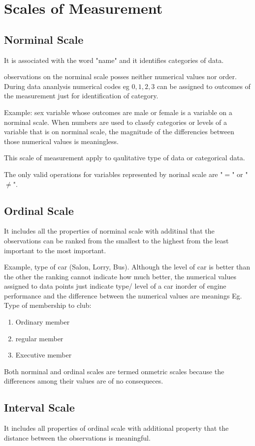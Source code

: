 \chapter{Scales of Measurement}%

\section{Norminal Scale}
It is associated with the word "name" and it identifies categories of data.

observations on the norminal scale posses neither numerical values nor order.
During data ananlysis numerical codes eg $0, 1, 2, 3$ can be assigned to outcomes of the measurement just for identification of category.

Example: sex variable whose outcomes are male or female is a variable on a norminal scale.
When numbers are used to classfy categories or levels of a variable that is on norminal scale, the magnitude of the differencies between those numerical values is meaningless.

This scale of measurement apply to qaulitative type of data or categorical data.

The only valid operations for variables represented by norinal scale are "$=$" or "$\neq$".
\section{Ordinal Scale}
It includes all the properties of norminal scale with additinal that the observations can be ranked from the smallest to the highest from the least important to the most important.

Example, type of car (Salon, Lorry, Bus).
Although the level of car is better than the other the ranking cannot indicate how much better, the numerical values assigned to data points just indicate type/ level of a car inorder of engine performance and the difference between the numerical values are meanings Eg. Type of membership to club:
\begin{enumerate}
    \item Ordinary member
    \item regular member
    \item Executive member
\end{enumerate}
Both norminal and ordinal scales are termed onmetric scales because the differences among their values are of no consequeces.
\section{Interval Scale}
It includes all properties of ordinal scale with additional property that the distance between the observations is meaningful.

